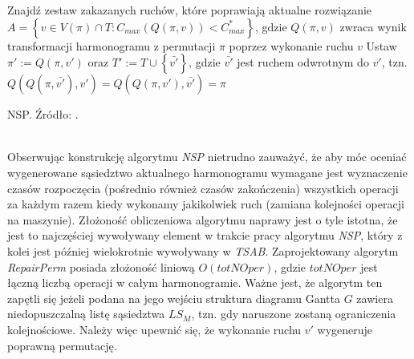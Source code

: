 \documentclass[printmode,oneside]{mgr}
\begin{document}
\begin{algorithm}[!ht]
    Znajdź zestaw zakazanych ruchów, które poprawiają aktualne rozwiązanie $A = \left\{ v \in V(\pi) \cap T : C_{max}(Q(\pi,v)) < C^*_{max}\right\}$, gdzie $Q(\pi,v)$ zwraca wynik transformacji harmonogramu z permutacji $\pi$ poprzez wykonanie ruchu $v$\;
    Ustaw $\pi' := Q(\pi,v')$ oraz $T' := T \cup \left\{ \bar{v'} \right\}$, gdzie $\bar{v'}$ jest ruchem odwrotnym do $v'$, tzn. $Q(Q(\pi,\bar{v'}),v') = Q(Q(\pi,v'),\bar{v'}) = \pi$\;
    \caption{NSP. Źródło: \cite{Smutnicki96}.}
\end{algorithm}
\ \\Obserwując konstrukcję algorytmu \emph{NSP} nietrudno zauważyć, że aby móc oceniać wygenerowane sąsiedztwo aktualnego harmonogramu wymagane jest wyznaczenie czasów rozpoczęcia (pośrednio również czasów zakończenia) wszystkich operacji za każdym razem kiedy wykonamy jakikolwiek ruch (zamiana kolejności operacji na maszynie). Złożoność obliczeniowa algorytmu naprawy jest o tyle istotna, że jest to najczęściej wywoływany element w trakcie pracy algorytmu \emph{NSP}, który z kolei jest później wielokrotnie wywoływany w \emph{TSAB}. Zaprojektowany algorytm \emph{RepairPerm} posiada złożoność liniową $O(totNOper)$, gdzie $totNOper$ jest łączną liczbą operacji w całym harmonogramie. Ważne jest, że algorytm ten zapętli się jeżeli podana na jego wejściu struktura diagramu Gantta $G$ zawiera niedopuszczalną listę sąsiedztwa $LS_M$, tzn. gdy naruszone zostaną ograniczenia kolejnościowe. Należy więc upewnić się, że wykonanie ruchu $v'$ wygeneruje poprawną permutację.
\end{document}
